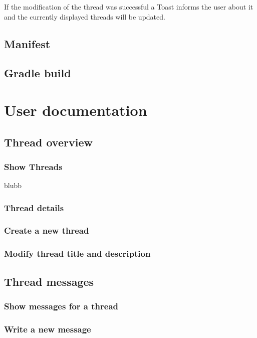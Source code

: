 \documentclass[12pt,a4paper,oneside]{report}
\begin{document}
If the modification of the thread was successful a Toast informs the user about it and the currently displayed threads will be updated.

\section{Manifest}

\section{Gradle build}

\chapter{User documentation}

\section{Thread overview}

\subsection{Show Threads}
blubb
\subsection{Thread details}

\subsection{Create a new thread}

\subsection{Modify thread title and description}

\section{Thread messages}

\subsection{Show messages for a thread}

\subsection{Write a new message}
\end{document}
